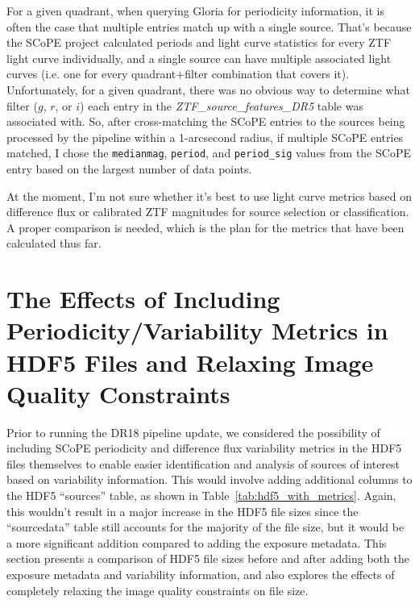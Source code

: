\documentclass[12pt]{article}
\begin{document}
\begin{enumerate}
    For a given quadrant, when querying Gloria for periodicity information, it is often the case that multiple entries match up with a single source. That's because the SCoPE project calculated periods and light curve statistics for every ZTF light curve individually, and a single source can have multiple associated light curves (i.e. one for every quadrant$+$filter combination that covers it). Unfortunately, for a given quadrant, there was no obvious way to determine what filter ($g$, $r$, or $i$) each entry in the {\it ZTF\_source\_features\_DR5} table was associated with. So, after cross-matching the SCoPE entries to the sources being processed by the pipeline within a 1-arcsecond radius, if multiple SCoPE entries matched, I chose the {\tt medianmag}, {\tt period}, and {\tt period\_sig} values from the SCoPE entry based on the largest number of data points.

    At the moment, I'm not sure whether it's best to use light curve metrics based on difference flux or calibrated ZTF magnitudes for source selection or classification. A proper comparison is needed, which is the plan for the metrics that have been calculated thus far.

\end{enumerate}


\section{The Effects of Including Periodicity/Variability Metrics in HDF5 Files and Relaxing Image Quality Constraints}

Prior to running the DR18 pipeline update, we considered the possibility of including SCoPE periodicity and difference flux variability metrics in the HDF5 files themselves to enable easier identification and analysis of sources of interest based on variability information. This would involve adding additional columns to the HDF5 ``sources'' table, as shown in Table~\ref{tab:hdf5_with_metrics}. Again, this wouldn't result in a major increase in the HDF5 file sizes since the ``sourcedata'' table still accounts for the majority of the file size, but it would be a more significant addition compared to adding the exposure metadata. This section presents a comparison of HDF5 file sizes before and after adding both the exposure metadata and variability information, and also explores the effects of completely relaxing the image quality constraints on file size.
\end{document}
